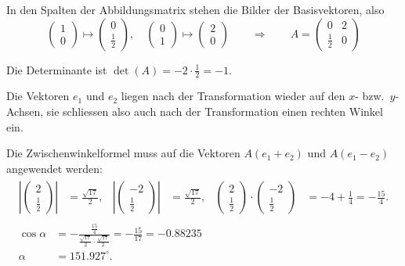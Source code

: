 \begin{loesung}
In den Spalten der Abbildungsmatrix stehen die Bilder der Basisvektoren, also
\[
\begin{pmatrix}1\\0\end{pmatrix}\mapsto\begin{pmatrix}0\\\frac12\end{pmatrix}
,\quad
\begin{pmatrix}0\\1\end{pmatrix}\mapsto\begin{pmatrix}2\\0\end{pmatrix}
\qquad
\Rightarrow\qquad
A=\begin{pmatrix}
0&2\\
\frac12&0
\end{pmatrix}
\]
\begin{teilaufgaben}
\item
Die Determinante ist $\det(A)=-2\cdot\frac12=-1.$
\item
Die Vektoren $e_1$ und $e_2$ liegen nach der Transformation wieder auf
den $x$- bzw.~$y$-Achsen, sie schliessen also auch nach der Transformation
einen rechten Winkel ein.
\item
Die Zwischenwinkelformel muss auf die Vektoren $A(e_1+e_2)$ und
$A(e_1-e_2)$ angewendet werden:
\begin{gather}
\begin{aligned}
\left|\begin{pmatrix}2\\\frac12\end{pmatrix}\right|&=\frac{\sqrt{17}}2,&
\left|\begin{pmatrix}-2\\\frac12\end{pmatrix}\right|&=\frac{\sqrt{17}}2,&
\begin{pmatrix}2\\\frac12\end{pmatrix}
\cdot
\begin{pmatrix}-2\\\frac12\end{pmatrix}
&=-4+\frac14=-\frac{15}4.
\end{aligned}
\\
\begin{aligned}
\cos\alpha&=-\frac{\frac{15}{4}}{\frac{\sqrt{17}}{2}\cdot\frac{\sqrt{17}}2}
=-\frac{15}{17}=-0.88235\\
\alpha&=151.927^\circ.
\end{aligned}
\end{gather}
\end{teilaufgaben}
\end{loesung}

